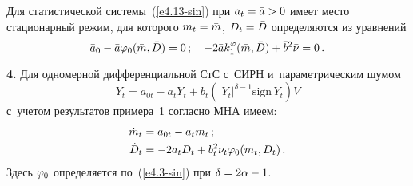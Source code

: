 \begin{multicols}{2}
Для статистической системы~(\ref{e4.13-sin}) при
$a_t \hm=\bar a\hm>0$ имеет место стационарный режим, для которого
$m_t\hm=\bar m$, $D_t \hm= \bar D$ определяются из уравнений
   \begin{equation*}
   \bar a_0 - \bar a \vrp_0 (\bar m, \bar D) =0\,;\quad
   -2\bar a k_1^\vrp (\bar m, \bar D) + \bar b^2 \bar \nu =0\,. %
   \end{equation*}

\textbf{4.}
Для одномерной дифференциальной СтС с~СИРН и~параметрическим шумом
\begin{equation*}
\dot Y_t = a_{0t} - a_t Y_t + b_t \left( \left\vert Y_t\right\vert^{\delta-1}
\mathrm{sign}\, Y_t\right) V
\end{equation*}
с~учетом результатов примера~1 согласно МНА \mbox{имеем}:
\begin{align*}
\dot m _t &= a_{0t} - a_t m_t\,;\\ %
\dot D_t &=-2a_t D_t + b_t^2 \nu_t \vrp_0 (m_t, D_t)\,. %
\end{align*}
Здесь $\varphi_0$ определяется по~(\ref{e4.3-sin}) при $\delta \hm= 2\alpha \hm-1$.


\end{multicols}
